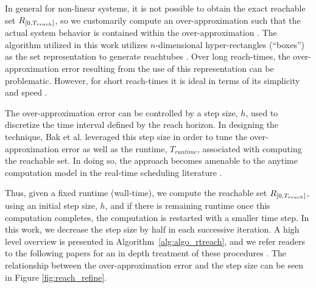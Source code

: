 \documentclass[manuscript,screen,review]{acmart}
\newcommand{\diego}[1]{\textcolor{purple}{\textbf{\underline{DM:}} #1}}
\begin{document}
In general for non-linear systems, it is not possible to obtain the exact reachable set $\mathnormal{R}_{[0,T_{reach}]}$, so we customarily compute an over-approximation such that the actual system behavior is contained within the over-approximation \cite{AlthoffNonlinear,Lin2020}. The algorithm utilized in this work utilizes $n$-dimensional hyper-rectangles (``boxes'') as the set representation to generate reachtubes \cite{Johnson2016}. Over long reach-times, the over-approximation error resulting from the use of this representation can be problematic. However, for short reach-times it is ideal in terms of its simplicity and speed \cite{Bak2014}.


The over-approximation error can be controlled by a step size, $h$, used to discretize the time interval defined by the reach horizon. In designing the technique, Bak et al. leveraged this step size in order to tune the over-approximation error as well as the runtime, $T_{runtime}$, associated with computing the reachable set. In doing so, the approach becomes amenable to the anytime computation model in the real-time scheduling literature \cite{Liu1991}.


Thus, given a fixed runtime (wall-time), we compute the reachable set $\mathnormal{R}_{[0,T_{reach}]}$, using an initial step size, $h$, and if there is remaining runtime once this computation completes, the computation is restarted with a smaller time step. In this work, we decrease the step size by half in each successive iteration. A high level overview is presented in Algorithm~\ref{alg:algo_rtreach}, and we refer readers to the following papers for an in depth treatment of these procedures \cite{dang2000,Bak2014,Johnson2016}. The relationship between the over-approximation error and the step size can be seen in Figure \ref{fig:reach_refine}.
\end{document}
